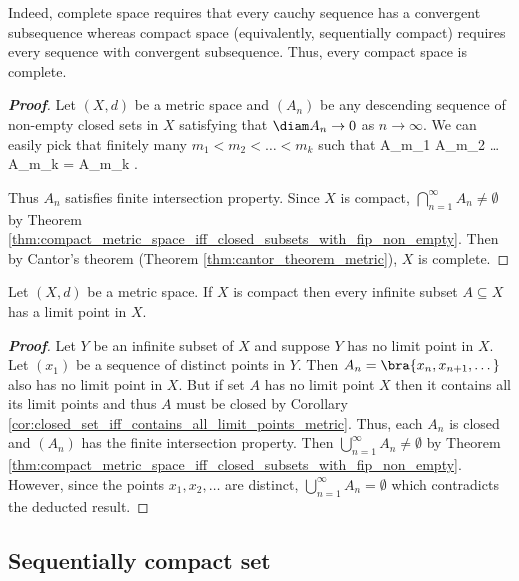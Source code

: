 \begin{remark}
Indeed, complete space requires that every cauchy sequence has a convergent subsequence whereas compact space (equivalently, sequentially compact) requires every sequence with convergent subsequence. Thus, every compact space is complete.
\end{remark}


\begin{proof}[\bf Proof]
Let $(X,d)$ be a metric space and $(A_n)$ be any descending sequence of non-empty closed sets in $X$ satisfying that $\diam A_n \to 0$ as $n\to \infty$. We can easily pick that finitely many $m_1<m_2<\dots < m_k$ such that
\be
A_{m_1} \cap A_{m_2} \cap \dots \cap A_{m_k} = A_{m_k} \neq \emptyset.
\ee

Thus $A_n$ satisfies finite intersection property. Since $X$ is compact, $\bigcap_{n=1}^\infty A_n \neq \emptyset$ by Theorem \ref{thm:compact_metric_space_iff_closed_subsets_with_fip_non_empty}. Then by Cantor's theorem (Theorem \ref{thm:cantor_theorem_metric}), $X$ is complete. %
\end{proof}

\begin{corollary}\label{cor:infinite_subset_of_compact_set_has_limit_point}
Let $(X,d)$ be a metric space. If $X$ is compact then every infinite subset $A\subseteq X$ has a limit point in $X$.
\end{corollary}


\begin{proof}[\bf Proof]
Let $Y$ be an infinite subset of $X$ and suppose $Y$ has no limit point in $X$. Let $(x_1)$ be a sequence of distinct points in $Y$. Then $A_n = \bra{x_n,x_{n+1},\dots}$ also has no limit point in $X$. But if set $A$ has no limit point $X$ then it contains all its limit points and thus $A$ must be closed by Corollary \ref{cor:closed_set_iff_contains_all_limit_points_metric}. Thus, each $A_n$ is closed and $(A_n)$ has the finite intersection property. Then $\bigcup^\infty_{n=1}A_n \neq \emptyset$ by Theorem \ref{thm:compact_metric_space_iff_closed_subsets_with_fip_non_empty}. However, since the points $x_1,x_2,\dots$ are distinct, $\bigcup^\infty_{n=1}A_n = \emptyset$ which contradicts the deducted result. %
\end{proof}


\subsection{Sequentially compact set}

